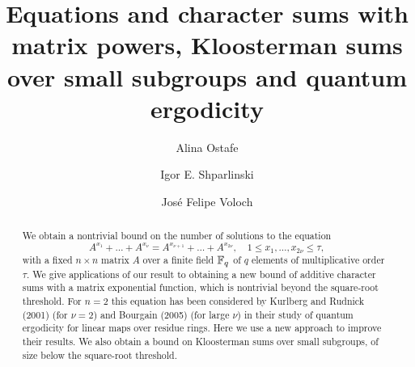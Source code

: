 \documentclass[12pt]{amsart}
\begin{document}
\def \Prob{{\mathrm {}}}
\def\e{\mathbf{e}}
\def\ep{{\mathbf{\,e}}_p}
\def\epp{{\mathbf{\,e}}_{p^2}}
\def\em{{\mathbf{\,e}}_m}

\def\Res{\mathrm{Res}}
\def\Orb{\mathrm{Orb}}

\def\vec#1{\mathbf{#1}}
\def \va{\vec{a}}
\def \vb{\vec{b}}
\def \vs{\vec{s}}
\def \vu{\vec{u}}
\def \vv{\vec{v}}
\def \vz{\vec{z}}
\def\flp#1{{\left\langle#1\right\rangle}_p}
\def\T {\mathsf {T}}

\def\sfG {\mathsf {G}}
\def\sfK {\mathsf {K}}

\def\mand{\qquad\mbox{and}\qquad}


 


\title[Matrix powers, Kloosterman 
sums,   quantum ergodicity]
{Equations  and character sums with matrix powers, Kloosterman 
sums over small subgroups and  quantum ergodicity}

 


\author[A. Ostafe] {Alina Ostafe}
\address{School of Mathematics and Statistics, University of New South Wales, Sydney NSW 2052, Australia}

\author[I. E. Shparlinski] {Igor E. Shparlinski}
\address{School of Mathematics and Statistics, University of New South Wales, Sydney NSW 2052, Australia}


 
 \author[J. F. Voloch] {Jos\'e Felipe Voloch}

\address{
School of Mathematics and Statistics,
University of Canterbury,
Private Bag 4800, Christchurch 8140, New Zealand}





\begin{abstract}  We obtain a nontrivial bound on the number of solutions to the equation 
$$A^{x_1} + \ldots + A^{x_\nu} = A^{x_{\nu+1}} + \ldots +  A^{x_{2\nu}}, \quad 1 \le x_1, \ldots,x_{2\nu} \le \tau,
$$ with a fixed  $n\times n$ matrix $A$ over  a finite field ${\mathbb F}_q$ of $q$ elements of multiplicative order $\tau$. We give applications of our result to obtaining a new bound of additive character sums with a matrix exponential function, which is nontrivial beyond the square-root threshold. For $n=2$ this equation has been considered by Kurlberg and Rudnick (2001) (for $\nu=2$) and Bourgain (2005) (for large $\nu$) in their study of quantum ergodicity for linear maps over residue rings.  Here we use a new approach to 
improve their results. We also  obtain a bound on Kloosterman sums over small subgroups, of size  below the square-root threshold.
\end{abstract} 
\end{document}
